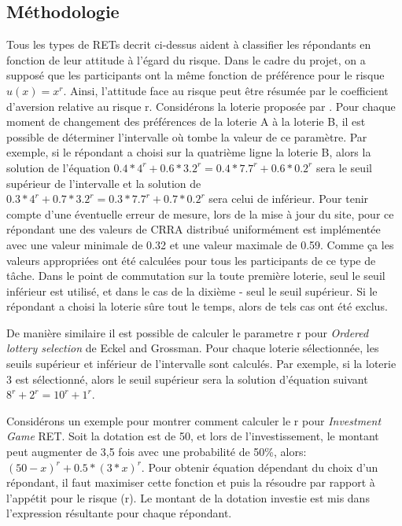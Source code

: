 \documentclass[12pt]{article}
\begin{document}
\subsection{Méthodologie}

Tous les types de RETs decrit ci-dessus aident à classifier les
répondants en fonction de leur attitude à l'égard du risque. Dans le
cadre du projet, on a supposé que les participants ont la même fonction
de préférence pour le risque \(u(x) = x^r\). Ainsi, l'attitude face au
risque peut être résumée par le coefficient d'aversion relative au
risque r. Considérons la loterie proposée par \citet{Holt2002}. Pour
chaque moment de changement des préférences de la loterie A à la loterie
B, il est possible de déterminer l'intervalle où tombe la valeur de ce
paramètre. Par exemple, si le répondant a choisi sur la quatrième ligne
la loterie B, alors la solution de l'équation
\(0.4*4^r + 0.6*3.2^r = 0.4*7.7^r + 0.6*0.2^r\) sera le seuil supérieur
de l'intervalle et la solution de
\(0.3*4^r + 0.7*3.2^r = 0.3*7.7^r + 0.7*0.2^r\) sera celui de inférieur.
Pour tenir compte d'une éventuelle erreur de mesure, lors de la mise à
jour du site, pour ce répondant une des valeurs de CRRA distribué
uniformément est implémentée avec une valeur minimale de 0.32 et une
valeur maximale de 0.59. Comme ça les valeurs appropriées ont été
calculées pour tous les participants de ce type de tâche. Dans le point
de commutation sur la toute première loterie, seul le seuil inférieur
est utilisé, et dans le cas de la dixième - seul le seuil supérieur. Si
le répondant a choisi la loterie sûre tout le temps, alors de tels cas
ont été exclus.

De manière similaire il est possible de calculer le parametre r pour
\emph{Ordered lottery selection} de Eckel and Grossman. Pour chaque
loterie sélectionnée, les seuils supérieur et inférieur de l'intervalle
sont calculés. Par exemple, si la loterie 3 est sélectionné, alors le
seuil supérieur sera la solution d'équation suivant
\(8^r + 2^r = 10^r + 1^r\).

Considérons un exemple pour montrer comment calculer le r pour
\emph{Investment Game} RET. Soit la dotation est de 50, et lors de
l'investissement, le montant peut augmenter de 3,5 fois avec une
probabilité de 50\%, alors: \((50 - x)^r + 0.5 * (3 * x)^r\). Pour
obtenir équation dépendant du choix d'un répondant, il faut maximiser
cette fonction et puis la résoudre par rapport à l'appétit pour le
risque (r). Le montant de la dotation investie est mis dans l'expression
résultante pour chaque répondant.
\end{document}
